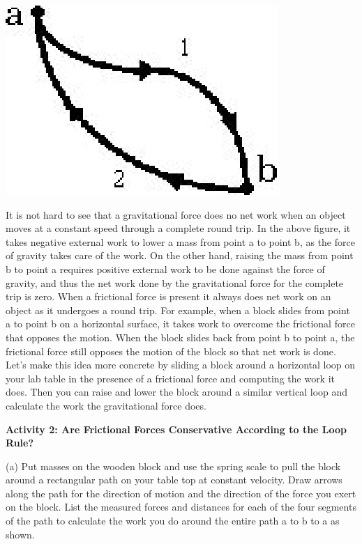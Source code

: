 \vspace{0.3cm}
{\par\centering \includegraphics{conservative_fig2.eps} \par}
\vspace{0.3cm}

It is not hard to see that a gravitational force does no net work when an object
moves at a constant speed through a complete round trip. In the above figure,
it takes negative external work to lower a mass from point a to point b, as
the force of gravity takes care of the work. On the other hand, raising the
mass from point b to point a requires positive external work to be done against
the force of gravity, and thus the net work done by the gravitational force
for the complete trip is zero. When a frictional force is present it always
does net work on an object as it undergoes a round trip. For example, when a
block slides from point a to point b on a horizontal surface, it takes work
to overcome the frictional force that opposes the motion. When the block slides
back from point b to point a, the frictional force still opposes the motion
of the block so that net work is done. Let's make this idea more concrete by
sliding a block around a horizontal loop on your lab table in the presence of
a frictional force and computing the work it does. Then you can raise and lower
the block around a similar vertical loop and calculate the work the gravitational force does.

\textbf{Activity 2: Are Frictional Forces Conservative According to the Loop
Rule?} 

(a) Put masses on the wooden block and use the spring scale to pull the block
around a rectangular path on your table top at constant velocity. Draw arrows
along the path for the direction of motion and the direction of the force you
exert on the block. List the measured forces and distances for each of the four
segments of the path to calculate the work you do around the entire path a to
b to a as shown.

